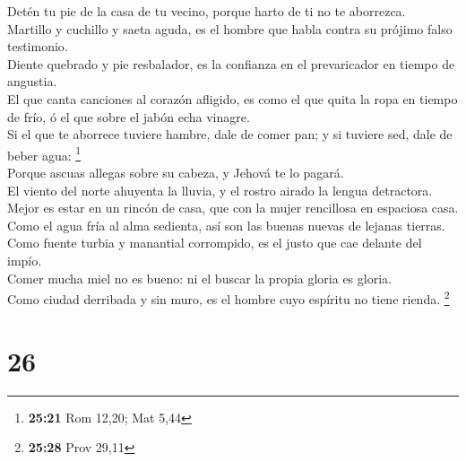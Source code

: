  Detén tu pie de la casa de tu vecino, porque harto de ti
no te aborrezca.\\
 Martillo y cuchillo y saeta aguda, es el hombre que habla
contra su prójimo falso testimonio.\\
 Diente quebrado y pie resbalador, es la confianza en el
prevaricador en tiempo de angustia.\\
 El que canta canciones al corazón afligido, es como el que
quita la ropa en tiempo de frío, ó el que sobre el jabón echa vinagre.\\
 Si el que te aborrece tuviere hambre, dale de comer pan; y
si tuviere sed, dale de beber agua: \footnote{\textbf{25:21} Rom 12,20;
  Mat 5,44}\\
 Porque ascuas allegas sobre su cabeza, y Jehová te lo
pagará.\\
 El viento del norte ahuyenta la lluvia, y el rostro airado
la lengua detractora.\\
 Mejor es estar en un rincón de casa, que con la mujer
rencillosa en espaciosa casa.\\
 Como el agua fría al alma sedienta, así son las buenas
nuevas de lejanas tierras.\\
 Como fuente turbia y manantial corrompido, es el justo que
cae delante del impío.\\
 Comer mucha miel no es bueno: ni el buscar la propia
gloria es gloria.\\
 Como ciudad derribada y sin muro, es el hombre cuyo
espíritu no tiene rienda. \footnote{\textbf{25:28} Prov 29,11}

\hypertarget{section-25}{%
\section{26}\label{section-25}}

